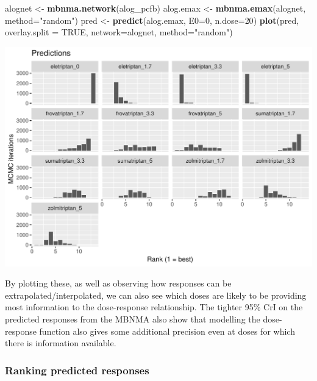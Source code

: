 \documentclass[]{article}
\newenvironment{Shaded}{\begin{snugshade}}{\end{snugshade}}
\newcommand{\DataTypeTok}[1]{\textcolor[rgb]{0.13,0.29,0.53}{#1}}
\newcommand{\DecValTok}[1]{\textcolor[rgb]{0.00,0.00,0.81}{#1}}
\newcommand{\KeywordTok}[1]{\textcolor[rgb]{0.13,0.29,0.53}{\textbf{#1}}}
\newcommand{\NormalTok}[1]{#1}
\newcommand{\OtherTok}[1]{\textcolor[rgb]{0.56,0.35,0.01}{#1}}
\newcommand{\StringTok}[1]{\textcolor[rgb]{0.31,0.60,0.02}{#1}}
\begin{document}
\begin{Shaded}
\begin{Highlighting}[]
\NormalTok{alognet <-}\StringTok{ }\KeywordTok{mbnma.network}\NormalTok{(alog_pcfb)}
\NormalTok{alog.emax <-}\StringTok{ }\KeywordTok{mbnma.emax}\NormalTok{(alognet, }\DataTypeTok{method=}\StringTok{"random"}\NormalTok{)}
\NormalTok{pred <-}\StringTok{ }\KeywordTok{predict}\NormalTok{(alog.emax, }\DataTypeTok{E0=}\DecValTok{0}\NormalTok{, }\DataTypeTok{n.dose=}\DecValTok{20}\NormalTok{)}
\KeywordTok{plot}\NormalTok{(pred, }\DataTypeTok{overlay.split =} \OtherTok{TRUE}\NormalTok{, }\DataTypeTok{network=}\NormalTok{alognet, }\DataTypeTok{method=}\StringTok{"random"}\NormalTok{)}
\end{Highlighting}
\end{Shaded}

\includegraphics{mbnmadose_files/figure-latex/unnamed-chunk-46-1.pdf}

By plotting these, as well as observing how responses can be
extrapolated/interpolated, we can also see which doses are likely to be
providing most information to the dose-response relationship. The
tighter 95\% CrI on the predicted responses from the MBNMA also show
that modelling the dose-response function also gives some additional
precision even at doses for which there is information available.

\hypertarget{ranking-predicted-responses}{%
\subsubsection{Ranking predicted
responses}\label{ranking-predicted-responses}}
\end{document}
